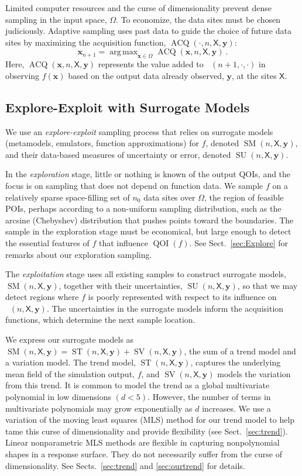\documentclass[11pt]{NSFamsart}
\DeclareMathOperator*{\argmax}{arg\,max}
\DeclareMathOperator{\QOI}{QOI} %
\DeclareMathOperator{\APP}{\widehat{\QOI}}
\DeclareMathOperator{\SURR}{SM} %
\DeclareMathOperator{\STREND}{ST} %
\DeclareMathOperator{\SVAR}{SV} %
\newcommand{\MLS}{\textrm{MLS}\xspace} %
\DeclareMathOperator{\VAL}{ACQ}
\DeclareMathOperator{\SURRERR}{SU}
\newcommand{\mX}{\mathsf{X}}
\newcommand{\bx}{{\boldsymbol{x}}}
\newcommand{\by}{{\boldsymbol{y}}}
\begin{document}
Limited computer resources and the curse of dimensionality prevent dense sampling in the input space, $\Omega$. To economize, the data sites must be chosen judiciously. Adaptive sampling uses past data to guide the choice of future data sites by maximizing the acquisition function, $\VAL(\cdot,n,\mX, \by)$: 
\begin{equation} \label{eq:nextsample}
\bx_{n+1} = \argmax_{\bx \in \Omega} \VAL(\bx,n,\mX, \by)~.
\end{equation}
Here, $\VAL(\bx,n,\mX, \by)$ represents the value added to $\APP(n+1,\cdot,\cdot)$ in observing $f(\bx)$ based on the output data already observed, $\by$, at the sites $\mX$. 

\subsection{Explore-Exploit with Surrogate Models} We use an \emph{explore-exploit} sampling process that relies on surrogate models (metamodels, emulators, function approximations) for $f$, denoted $\SURR(n,\mX,\by)$, and their data-based measures of uncertainty or error, denoted $\SURRERR(n,\mX,\by)$. 

In the \emph{exploration} stage, little or nothing is known of the output QOIs, and the focus is on sampling that does not depend on function data. We sample $f$ on a relatively sparse space-filling set of $n_0$ data sites over $\Omega$, the region of feasible POIs, perhaps according to a non-uniform sampling distribution, such as the arcsine (Chebyshev) distribution that pushes points toward the boundaries. The sample in the exploration stage must be economical, but large enough to detect the essential features of $f$ that influence $\QOI(f)$.  See Sect.\ \ref{sec:Explore} for remarks about our exploration sampling.

The \emph{exploitation} stage uses all existing samples to construct surrogate models, $\SURR(n,\mX,\by)$, together with their uncertainties, $\SURRERR(n,\mX,\by)$, so that we may detect regions where $f$ is poorly represented with respect to its influence on $\APP(n,\mX,\by)$. The uncertainties in the surrogate models inform the acquisition functions, which determine the next sample location.

We express our surrogate models as $\SURR(n,\mX,\by) = \STREND(n,\mX,\by) + \SVAR(n,\mX,\by)$, the sum of a trend model and a variation model. 
The trend model, $\STREND(n,\mX,\by)$, captures the underlying mean field of the simulation output, $f$, and $\SVAR(n,\mX,\by)$ models the variation from this trend. 
It is common to model the trend as a global multivariate polynomial in low dimensions $(d<5)$. 
However, the number of terms in multivariate polynomials may grow exponentially as $d$ increases. We use 
a variation of the moving least squares (\MLS) method \cite{liumovingpartI1997, limovingpartII1996, salehi2013generalized, mederos2003moving} for our trend model to help tame this curse of dimensionality and provide flexibility (see Sect.\ \ref{sec:trend}). Linear nonparametric \MLS methods are flexible in capturing nonpolynomial shapes in a response surface. They do not necessarily suffer from the curse of dimensionality. 
See Sects.\ \ref{sec:trend} and \ref{sec:ourtrend}  for details. 
\end{document}
